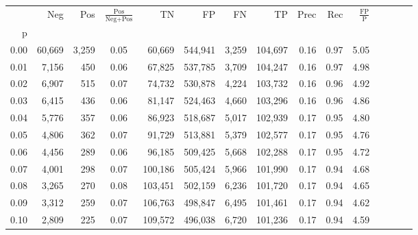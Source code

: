 \begin{tabular}{rrrcrrrrrrrrrrr}
\toprule
{} &     Neg &     Pos & $\frac{\text{Pos}}{\text{Neg}+\text{Pos}}$ &       TN &       FP &       FN &       TP &  Prec &   Rec & $\frac{\text{FP}}{\text{P}}$ \\
p    &         &         &                                            &          &          &          &          &       &       &                              \\
\midrule
0.00 &  60,669 &   3,259 &                                       0.05 &   60,669 &  544,941 &    3,259 &  104,697 &  0.16 &  0.97 &                         5.05 \\
0.01 &   7,156 &     450 &                                       0.06 &   67,825 &  537,785 &    3,709 &  104,247 &  0.16 &  0.97 &                         4.98 \\
0.02 &   6,907 &     515 &                                       0.07 &   74,732 &  530,878 &    4,224 &  103,732 &  0.16 &  0.96 &                         4.92 \\
0.03 &   6,415 &     436 &                                       0.06 &   81,147 &  524,463 &    4,660 &  103,296 &  0.16 &  0.96 &                         4.86 \\
0.04 &   5,776 &     357 &                                       0.06 &   86,923 &  518,687 &    5,017 &  102,939 &  0.17 &  0.95 &                         4.80 \\
0.05 &   4,806 &     362 &                                       0.07 &   91,729 &  513,881 &    5,379 &  102,577 &  0.17 &  0.95 &                         4.76 \\
0.06 &   4,456 &     289 &                                       0.06 &   96,185 &  509,425 &    5,668 &  102,288 &  0.17 &  0.95 &                         4.72 \\
0.07 &   4,001 &     298 &                                       0.07 &  100,186 &  505,424 &    5,966 &  101,990 &  0.17 &  0.94 &                         4.68 \\
0.08 &   3,265 &     270 &                                       0.08 &  103,451 &  502,159 &    6,236 &  101,720 &  0.17 &  0.94 &                         4.65 \\
0.09 &   3,312 &     259 &                                       0.07 &  106,763 &  498,847 &    6,495 &  101,461 &  0.17 &  0.94 &                         4.62 \\
0.10 &   2,809 &     225 &                                       0.07 &  109,572 &  496,038 &    6,720 &  101,236 &  0.17 &  0.94 &                         4.59 \\

\end{tabular}

